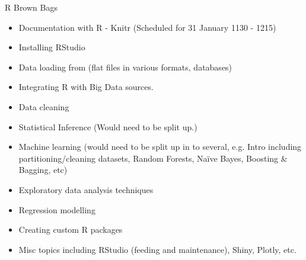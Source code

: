 \documentclass{beamer}
\begin{document}
\begin{frame}{
	\begin{minipage}[t]{0.75\textwidth}
		R Brown Bags
	\end{minipage}
	\hfill
	\begin{minipage}[t]{0.25\textwidth}
		\flushright
	\end{minipage}
}{}
	\begin{itemize}
		\item Documentation with R - Knitr (Scheduled for 31 January 1130 - 1215)
		\item Installing RStudio
		\item Data loading from (flat files in various formats, databases)
		\item Integrating R with Big Data sources.
		\item Data cleaning
		\item Statistical Inference (Would need to be split up.)
		\item Machine learning (would need to be split up in to several, e.g. Intro including partitioning/cleaning datasets, Random Forests, Naïve Bayes, Boosting \& Bagging, etc) 
		\item Exploratory data analysis techniques
		\item Regression modelling
		\item Creating custom R packages
		\item Misc topics including RStudio (feeding and maintenance), Shiny, Plotly, etc.
	\end{itemize}
\end{frame}
\end{document}
